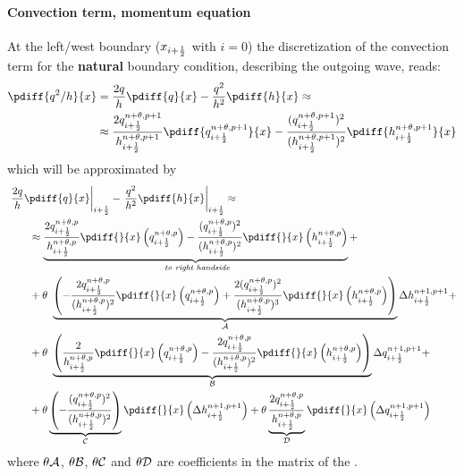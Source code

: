 \paragraph*{Convection term, momentum equation}
At the left/west boundary ($x_{i+\frac{1}{2}}$ with $i=0$) the discretization of the convection term for the \textbf{natural} boundary condition, describing the outgoing wave, reads:
\begin{align}
    \pdiff{q^2/h}{x} & = \frac{2q}{h}\pdiff{q}{x} - \frac{q^2}{h^2}\pdiff{h}{x} \approx
    \nonumber \\*
    & \approx \frac{2q^{n+\theta, p+1}_{i+\half}}{h^{n+\theta, p+1}_{i+\half}}\pdiff{q^{n+\theta, p+1}_{i+\half}}{x} - \frac{(q^{n+\theta, p+1}_{i+\half})^2}{(h^{n+\theta, p+1}_{i+\half})^2}\pdiff{h^{n+\theta, p+1}_{i+\half}}{x}
\end{align}
which will be approximated by
\begin{align}
    & \left. \frac{2q}{h}\pdiff{q}{x}\right|_{i+\half} - \left. \frac{q^2}{h^2}\pdiff{h}{x}\right|_{i+\half}
    \approx
    \\
    & \qquad \approx \underbrace{\frac{2q^{n+\theta, p}_{i+\half}}{ h^{n+\theta, p}_{i+\half}} \pdiff{}{x}\left( q^{n+\theta, p}_{i+\half} \right)
        - \frac{(q^{n+\theta, p}_{i+\half})^2}{(h^{n+\theta, p}_{i+\half})^2} \pdiff{}{x} \left( h^{n+\theta, p}_{i+\half} \right)}_{\textit{ to right handside}} +
    \nonumber \\
    & \qquad + \theta\ \underbrace{\left( -\frac{2q^{n+\theta, p}_{i+\half}}{ (h^{n+\theta, p}_{i+\half})^2}  \pdiff{}{x} \left( q^{n+\theta,p}_{i+\half}  \right)
        + \frac{2(q^{n+\theta, p}_{i+\half})^2}{(h^{n+\theta, p}_{i+\half})^3} \pdiff{}{x} \left( h^{n+\theta,p} _{i+\half} \right)
        \right)}_{\cal A} \Delta h^{n+1, p+1}_{i+\half} +
    \nonumber \\
    & \qquad + \theta\ \underbrace{\left( \frac{2}{ h^{n+\theta, p}_{i+\half}} \pdiff{}{x} \left( q^{n+\theta, p}_{i+\half} \right)
        -  \frac{2q^{n+\theta, p}_{i+\half}}{(h^{n+\theta, p}_{i+\half})^2} \pdiff{}{x} \left( h^{n+\theta, p}_{i+\half} \right)
        \right)}_{\cal B} \Delta q^{n+1, p+1}_{i+\half} +
    \nonumber \\
    &
    \qquad + \theta \underbrace{\left(- \frac{(q^{n+\theta, p}_{i+\half})^2}{(h^{n+\theta, p}_{i+\half})^2} \right)}_{\cal C} \pdiff{}{x} \left( \Delta h^{n+1, p+1}_{i+\half} \right)
    + \theta \underbrace{\frac{2q^{n+\theta, p}_{i+\half}}{ h^{n+\theta, p}_{i+\half}}}_{\cal D} \pdiff{}{x} \left( \Delta q^{n+1, p+1}_{i+\half} \right)
\end{align}
where $\theta\cal{A}$, $\theta\cal{B}$, $\theta\cal{C}$ and $\theta\cal{D}$ are coefficients in the matrix of the \deltaformulation.
